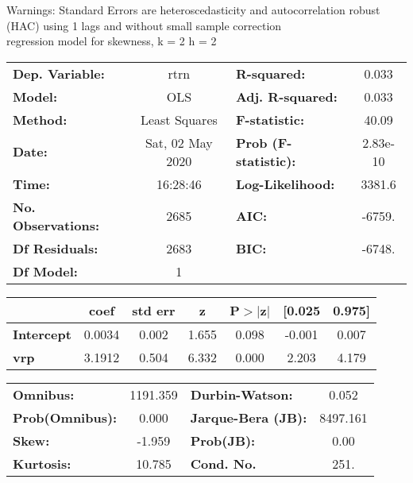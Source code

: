 Warnings: \newline
 [1] Standard Errors are heteroscedasticity and autocorrelation robust (HAC) using 1 lags and without small sample correction\\ 

regression model for skewness, k = 2 h = 2\begin{center}
\begin{tabular}{lclc}
\toprule
\textbf{Dep. Variable:}    &       rtrn       & \textbf{  R-squared:         } &     0.033   \\
\textbf{Model:}            &       OLS        & \textbf{  Adj. R-squared:    } &     0.033   \\
\textbf{Method:}           &  Least Squares   & \textbf{  F-statistic:       } &     40.09   \\
\textbf{Date:}             & Sat, 02 May 2020 & \textbf{  Prob (F-statistic):} &  2.83e-10   \\
\textbf{Time:}             &     16:28:46     & \textbf{  Log-Likelihood:    } &    3381.6   \\
\textbf{No. Observations:} &        2685      & \textbf{  AIC:               } &    -6759.   \\
\textbf{Df Residuals:}     &        2683      & \textbf{  BIC:               } &    -6748.   \\
\textbf{Df Model:}         &           1      & \textbf{                     } &             \\
\bottomrule
\end{tabular}
\begin{tabular}{lcccccc}
                   & \textbf{coef} & \textbf{std err} & \textbf{z} & \textbf{P$> |$z$|$} & \textbf{[0.025} & \textbf{0.975]}  \\
\midrule
\textbf{Intercept} &       0.0034  &        0.002     &     1.655  &         0.098        &       -0.001    &        0.007     \\
\textbf{vrp}       &       3.1912  &        0.504     &     6.332  &         0.000        &        2.203    &        4.179     \\
\bottomrule
\end{tabular}
\begin{tabular}{lclc}
\textbf{Omnibus:}       & 1191.359 & \textbf{  Durbin-Watson:     } &    0.052  \\
\textbf{Prob(Omnibus):} &   0.000  & \textbf{  Jarque-Bera (JB):  } & 8497.161  \\
\textbf{Skew:}          &  -1.959  & \textbf{  Prob(JB):          } &     0.00  \\
\textbf{Kurtosis:}      &  10.785  & \textbf{  Cond. No.          } &     251.  \\
\bottomrule
\end{tabular}
\end{center}


